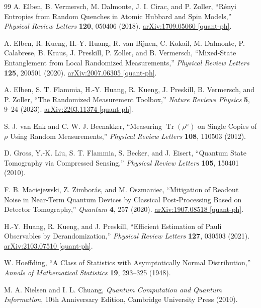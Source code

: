 \documentclass[12pt,a4paper,oneside]{book}
\theoremstyle{plain}
\theoremstyle{definition}
\theoremstyle{remark}
\begin{document}
\begin{thebibliography}{99}
A. Elben, B. Vermersch, M. Dalmonte, J. I. Cirac, and P. Zoller,
``R\'enyi Entropies from Random Quenches in Atomic Hubbard and Spin Models,''
\emph{Physical Review Letters} \textbf{120}, 050406 (2018).
\href{https://arxiv.org/abs/1709.05060}{arXiv:1709.05060 [quant-ph]}.

A. Elben, R. Kueng, H.-Y. Huang, R. van Bijnen, C. Kokail, M. Dalmonte, P. Calabrese, B. Kraus, J. Preskill, P. Zoller, and B. Vermersch,
``Mixed-State Entanglement from Local Randomized Measurements,''
\emph{Physical Review Letters} \textbf{125}, 200501 (2020).
\href{https://arxiv.org/abs/2007.06305}{arXiv:2007.06305 [quant-ph]}.

A. Elben, S. T. Flammia, H.-Y. Huang, R. Kueng, J. Preskill, B. Vermersch, and P. Zoller,
``The Randomized Measurement Toolbox,''
\emph{Nature Reviews Physics} \textbf{5}, 9--24 (2023).
\href{https://arxiv.org/abs/2203.11374}{arXiv:2203.11374 [quant-ph]}.

S. J. van Enk and C. W. J. Beenakker,
``Measuring $\operatorname{Tr}(\rho^n)$ on Single Copies of $\rho$ Using Random Measurements,''
\emph{Physical Review Letters} \textbf{108}, 110503 (2012).

D. Gross, Y.-K. Liu, S. T. Flammia, S. Becker, and J. Eisert,
``Quantum State Tomography via Compressed Sensing,''
\emph{Physical Review Letters} \textbf{105}, 150401 (2010).

F. B. Maciejewski, Z. Zimbor\'as, and M. Oszmaniec,
``Mitigation of Readout Noise in Near-Term Quantum Devices by Classical Post-Processing Based on Detector Tomography,''
\emph{Quantum} \textbf{4}, 257 (2020).
\href{https://arxiv.org/abs/1907.08518}{arXiv:1907.08518 [quant-ph]}.

H.-Y. Huang, R. Kueng, and J. Preskill,
``Efficient Estimation of Pauli Observables by Derandomization,''
\emph{Physical Review Letters} \textbf{127}, 030503 (2021).
\href{https://arxiv.org/abs/2103.07510}{arXiv:2103.07510 [quant-ph]}.

W. Hoeffding,
``A Class of Statistics with Asymptotically Normal Distribution,''
\emph{Annals of Mathematical Statistics} \textbf{19}, 293--325 (1948).

M. A. Nielsen and I. L. Chuang,
\emph{Quantum Computation and Quantum Information},
10th Anniversary Edition, Cambridge University Press (2010).


\end{thebibliography}
\end{document}
